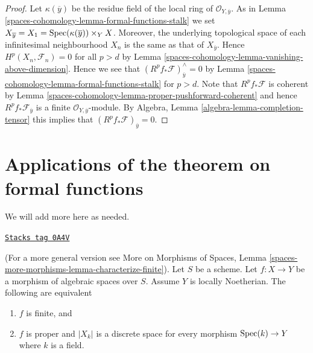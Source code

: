 \begin{proof}
Let $\kappa(\overline{y})$ be the residue field of the local
ring of $\mathcal{O}_{Y, \overline{y}}$. As in
Lemma \ref{spaces-cohomology-lemma-formal-functions-stalk}
we set $X_{\overline{y}} = X_1 = \operatorname{Spec}(\kappa(\overline{y})) \times_Y X$.
Moreover, the underlying topological space of each infinitesimal
neighbourhood $X_n$ is the same as that of $X_{\overline{y}}$.
Hence $H^p(X_n, \mathcal{F}_n) = 0$ for all $p > d$ by
Lemma \ref{spaces-cohomology-lemma-vanishing-above-dimension}.
Hence we see that $(R^pf_*\mathcal{F})_{\overline{y}}^\wedge = 0$
by Lemma \ref{spaces-cohomology-lemma-formal-functions-stalk} for $p > d$.
Note that $R^pf_*\mathcal{F}$ is coherent by
Lemma \ref{spaces-cohomology-lemma-proper-pushforward-coherent} and
hence $R^pf_*\mathcal{F}_{\overline{y}}$ is a finite
$\mathcal{O}_{Y, \overline{y}}$-module.
By Algebra, Lemma \ref{algebra-lemma-completion-tensor}
this implies that $(R^pf_*\mathcal{F})_{\overline{y}} = 0$.
\end{proof}

\section{Applications of the theorem on formal functions}
\label{spaces-cohomology-section-applications-formal-functions}
We will add more here as needed.

\begin{lemma}
\label{spaces-cohomology-lemma-characterize-finite}
\href{https://stacks.math.columbia.edu/tag/0A4V}{\texttt{Stacks tag 0A4V}}

(For a more general version see
More on Morphisms of Spaces, Lemma
\ref{spaces-more-morphisms-lemma-characterize-finite}).
Let $S$ be a scheme.
Let $f : X \to Y$ be a morphism of algebraic spaces over $S$.
Assume $Y$ is locally Noetherian.
The following are equivalent
\begin{enumerate}
\item $f$ is finite, and
\item $f$ is proper and $|X_k|$ is a discrete space
for every morphism $\operatorname{Spec}(k) \to Y$ where $k$ is a field.
\end{enumerate}
\end{lemma}

